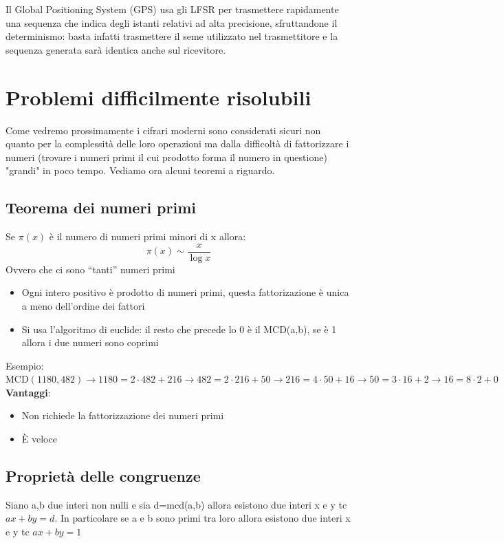 \documentclass[10pt,a4paper]{article}
\begin{document}
Il Global Positioning System (GPS) usa gli LFSR per trasmettere rapidamente una sequenza che indica degli istanti relativi ad alta precisione, sfruttandone il determinismo: basta infatti trasmettere il seme utilizzato nel trasmettitore e la sequenza generata sarà identica anche sul ricevitore.

\section{Problemi difficilmente risolubili}
Come vedremo prossimamente i cifrari moderni sono considerati sicuri non quanto per la complessità delle loro operazioni ma dalla difficoltà di fattorizzare i numeri (trovare i numeri primi il cui prodotto forma il numero in questione) "grandi" in poco tempo. Vediamo ora alcuni teoremi a riguardo.

\subsection{Teorema dei numeri primi}
Se $\pi(x)$ è il numero di numeri primi minori di x allora:
$$\pi(x) \sim \frac{x}{\log x}$$
Ovvero che ci sono ``tanti'' numeri primi
\begin{itemize}
\item Ogni intero positivo è prodotto di numeri primi, questa fattorizazione è unica a meno dell'ordine dei fattori
\item Si usa l'algoritmo di euclide: il resto che precede lo 0 è il MCD(a,b), se è 1 allora i due numeri sono coprimi
\end{itemize}
Esempio:\\
$\text{MCD} (1180,482) \rightarrow
1180 = 2 \cdot 482+216 \rightarrow
482 = 2 \cdot 216+50 \rightarrow
216 = 4 \cdot 50+16 \rightarrow
50 = 3 \cdot 16+2 \rightarrow
16 = 8 \cdot 2 +0$\\
\textbf{Vantaggi}:
\begin{itemize}
\item Non richiede la fattorizzazione dei numeri primi
\item È veloce
\end{itemize}

\subsection{Proprietà delle congruenze}
Siano a,b due interi non nulli e sia d=mcd(a,b) allora esistono due interi x e y tc $ax+by=d$. In particolare se a e b sono primi tra loro allora esistono due interi x e y tc $ax+by=1$
\end{document}
